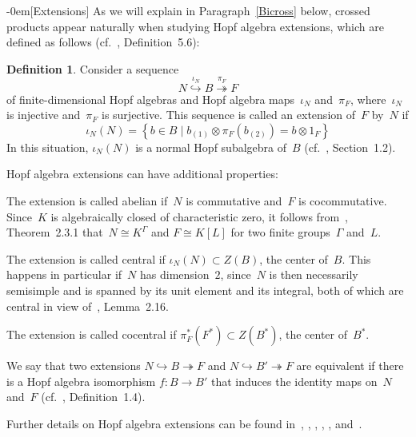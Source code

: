 \documentclass{article}
\makeatletter
\renewcommand{\subsection}{\@startsection{subsection}{2}{0em}%
{\baselineskip}{-0em}{\bfseries\normalsize}}
\newcounter{num}
\newenvironment{parlist1}{\begin{list}{(\arabic{num})}{\usecounter{num} \leftmargin0pt \itemindent5pt \itemsep7pt \topsep0pt \labelwidth0pt}}{\end{list}}
\newcounter{num1}
\numberwithin{equation}{section}
\theoremstyle{definition}
\newtheorem*{defn}{Definition}
\theoremstyle{break}
\newcommand{\ot}{\mathbin{\otimes}}
\newcommand{\1}{{(1)}}
\newcommand{\2}{{(2)}}
\newcommand{\3}{{(3)}}
\makeatother
\begin{document}
\subsection[Extensions]{} \label{Extens}
As we will explain in Paragraph~\ref{Bicross} below, crossed products appear naturally when studying Hopf algebra extensions, which are defined as follows (cf.~\cite{MaQu}, Definition~5.6):
\begin{defn}
Consider a sequence
\begin{equation*}
N \overset{\iota_N}{\hookrightarrow} B \overset{\pi_F}{\twoheadrightarrow} F
\end{equation*}
of finite-dimensional Hopf algebras and Hopf algebra maps~$\iota_N$ and~$\pi_F$, where~$\iota_N$ is injective and~$\pi_F$ is surjective. This sequence is called an extension of~$F$ by~$N$ if
\[\iota_N(N) =
\left\{ b\in B \mid b_{\1} \ot \pi_F(b_{\2}) = b \ot 1_{F}\right\} \]
In this situation, $\iota_N(N)$ is a normal Hopf subalgebra of~$B$ (cf.~\cite{AndNot}, Section~1.2).
\end{defn}

Hopf algebra extensions can have additional properties:
\begin{parlist1}
\item
The extension is called abelian if~$N$ is commutative and~$F$ is
cocommutative. Since~$K$ is algebraically closed of characteristic zero, it follows from~\cite{M}, Theorem~2.3.1 that~$N \cong K^\Gamma$ and $F \cong K[L]$ for two finite groups~$\Gamma$ and~$L$.

\item
The extension is called central if $\iota_N(N) \subset Z(B)$, the center of~$B$. This happens in particular if~$N$ has dimension~$2$, since~$N$ is then necessarily semisimple and is spanned by its unit element and its integral, both of which are central in view of~\cite{Ma0}, Lemma~2.16.

\item
The extension is called cocentral if $\pi_F^*(F^*) \subset Z(B^*)$, the center of~$B^*$.

\item
We say that two extensions $N \hookrightarrow B \twoheadrightarrow F$ and $N \hookrightarrow B' \twoheadrightarrow F$ are equivalent if there is a Hopf algebra isomorphism $f \colon B\rightarrow B'$ that induces the identity maps on~$N$ and~$F$ (cf.~\cite{Ma4}, Definition~1.4).
\end{parlist1}

Further details on Hopf algebra extensions can be found in~\cite{AD}, \cite{AndNot}, \cite{HofstDiss}, \cite{Hofst}, \cite{MaQu}, and~\cite{Ma4}. 
\end{document}
